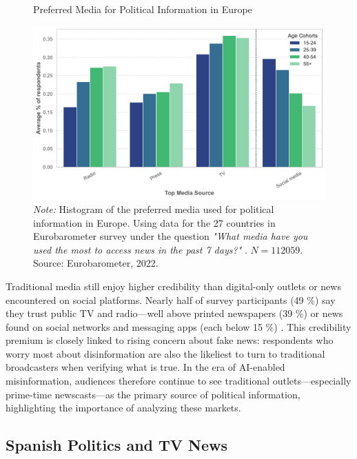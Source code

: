 \documentclass[12pt]{article}
\begin{document}
	\begin{figure}[!htb]
		\centering
		\caption{Preferred Media for Political Information in Europe}
		\includegraphics[width=130mm]{figures/age_cohorts_full}
		\caption*{\small \textit{Note:} Histogram of the preferred media used for political information in Europe. Using data for the 27 countries in Eurobarometer survey under the question \textit{"What media have you used the most to access news in the past 7 days?" }. $N=112059.$ 
			Source: Eurobarometer, 2022. }
		\label{fig:motivation2}
	\end{figure}
	
	
	
	
	
	
	Traditional media still enjoy higher credibility than digital-only outlets or news encountered on social platforms. Nearly half  of survey participants (49 \%) say they trust public TV and radio—well above printed newspapers (39 \%) or news found on social networks and messaging apps (each below 15 \%) \citep{eurobarometer2022}. This credibility premium is closely linked to rising concern about fake news: respondents who worry most about disinformation are also the likeliest to turn to traditional broadcasters when verifying what is true. In the era of AI-enabled misinformation, audiences therefore continue to see traditional outlets—especially prime-time newscasts—as the primary source of political information, highlighting the importance of analyzing these markets. 
	
	
	
	
	
	
	\subsection{Spanish Politics and TV News}
	
\end{document}
